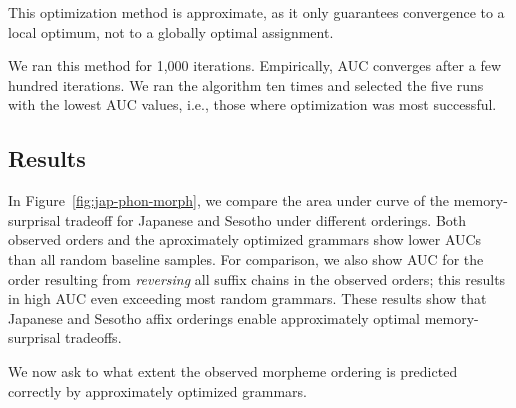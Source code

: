 This optimization method is approximate, as it only guarantees convergence to a local optimum, not to a globally optimal assignment.

We ran this method for 1,000 iterations. Empirically, AUC converges after a few hundred iterations.
We ran the algorithm ten times and selected the five runs with the lowest AUC values, i.e., those where optimization was most successful.

\subsection{Results}

In Figure~\ref{fig:jap-phon-morph}, we compare the area under curve of the memory-surprisal tradeoff for Japanese and Sesotho under different orderings.
Both observed orders and the aproximately optimized grammars show lower AUCs than all random baseline samples.
For comparison, we also show AUC for the order resulting from \emph{reversing} all suffix chains in the observed orders; this results in high AUC even exceeding most random grammars.
These results show that Japanese and Sesotho affix orderings enable approximately optimal memory-surprisal tradeoffs.

%


We now ask to what extent the observed morpheme ordering is predicted correctly by approximately optimized grammars.

